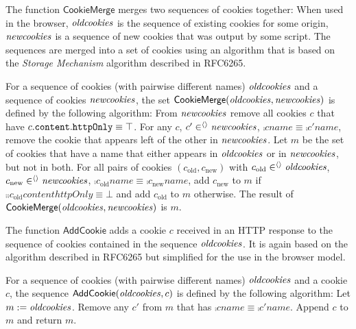 The function $\mathsf{CookieMerge}$ merges two sequences of
cookies together: When used in the browser,
$\mathit{oldcookies}$ is the sequence of existing cookies for
some origin, $\mathit{newcookies}$ is a sequence of new cookies
that was output by some script. The sequences are merged
into a set of cookies using an algorithm that is based on
the \emph{Storage Mechanism} algorithm described in
RFC6265.
\begin{definition} \label{def:cookiemerge} For a sequence
  of cookies (with pairwise different names)
  $\mathit{oldcookies}$ and a sequence of cookies
  $\mathit{newcookies}$, the set
  $\mathsf{CookieMerge}(\mathit{oldcookies}, \mathit{newcookies})$
  is defined by the following algorithm: From
  $\mathit{newcookies}$ remove all cookies $c$ that have
  $c.\mathtt{content}.\mathtt{httpOnly} \equiv \top$. For any
  $c$, $c' \in^{\langle\rangle} \mathit{newcookies}$, $\comp{c}{name}
  \equiv \comp{c'}{name}$, remove the cookie that appears
  left of the other in $\mathit{newcookies}$. Let $m$ be the
  set of cookies that have a name that either appears in
  $\mathit{oldcookies}$ or in $\mathit{newcookies}$, but not in
  both. For all pairs of cookies $(c_\text{old},
  c_\text{new})$ with $c_\text{old} \in^{\langle\rangle}
  \mathit{oldcookies}$, $c_\text{new} \in^{\langle\rangle}
  \mathit{newcookies}$, $\comp{c_\text{old}}{name} \equiv
  \comp{c_\text{new}}{name}$, add $c_\text{new}$ to $m$ if
  $\comp{\comp{c_\text{old}}{content}}{httpOnly} \equiv
  \bot$ and add $c_\text{old}$ to $m$ otherwise. The result
  of $\mathsf{CookieMerge}(\mathit{oldcookies},
  \mathit{newcookies})$ is $m$.
\end{definition}

The function $\mathsf{AddCookie}$ adds a cookie $c$
received in an HTTP response to the sequence of cookies
contained in the sequence $\mathit{oldcookies}$. It is again
based on the algorithm described in RFC6265 but simplified
for the use in the browser model.
\begin{definition} \label{def:addcookie} For a sequence of cookies (with pairwise different
  names) $\mathit{oldcookies}$ and a cookie $c$, the sequence
  $\mathsf{AddCookie}(\mathit{oldcookies}, c)$ is defined by the
  following algorithm: Let $m := \mathit{oldcookies}$. Remove
  any $c'$ from $m$ that has $\comp{c}{name} \equiv
  \comp{c'}{name}$. Append $c$ to $m$ and return $m$.
\end{definition}

